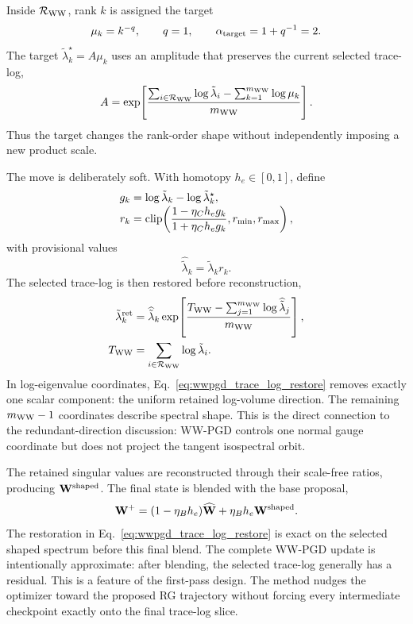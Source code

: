 Inside $\mathcal R_{\rm WW}$, rank $k$ is assigned the target
\begin{equation}
  \mu_k=k^{-q},
  \qquad q=1,
  \qquad \alpha_{\rm target}=1+q^{-1}=2.
  \label{eq:wwpgd_rank_target}
\end{equation}
The target $\tilde\lambda_k^{\star}=A\mu_k$ uses an amplitude that preserves the current selected trace-log,
\begin{equation}
  A
  =
  \exp\!\left[
  \frac{
  \sum_{i\in\mathcal R_{\rm WW}}\log\tilde\lambda_i
  -
  \sum_{k=1}^{m_{\rm WW}}\log\mu_k
  }{m_{\rm WW}}
  \right].
  \label{eq:wwpgd_target_amplitude}
\end{equation}
Thus the target changes the rank-order shape without independently imposing a new product scale.

The move is deliberately soft.  With homotopy $h_e\in[0,1]$, define
\begin{align}
  g_k
  &=
  \log\tilde\lambda_k-
  \log\tilde\lambda_k^{\star},
  \notag\\[-0.3em]
  r_k
  &=
  \operatorname{clip}\!\left(
  \frac{1-\eta_C h_e g_k}
       {1+\eta_C h_e g_k},
  r_{\min},r_{\max}
  \right),
  \label{eq:wwpgd_cayley_move}
\end{align}
with provisional values
\begin{equation}
  \widehat{\tilde\lambda}_k
  =
  \tilde\lambda_k r_k.
  \label{eq:wwpgd_provisional_eigenvalues}
\end{equation}
The selected trace-log is then restored before reconstruction,
\begin{align}
  \tilde\lambda_k^{\rm ret}
  &=
  \widehat{\tilde\lambda}_k
  \exp\!\left[
  \frac{
  T_{\rm WW}
  -
  \sum_{j=1}^{m_{\rm WW}}
  \log\widehat{\tilde\lambda}_j
  }{m_{\rm WW}}
  \right],
  \label{eq:wwpgd_trace_log_restore}\\
  T_{\rm WW}
  &=
  \sum_{i\in\mathcal R_{\rm WW}}
  \log\tilde\lambda_i.
  \label{eq:wwpgd_current_trace_log}
\end{align}
In log-eigenvalue coordinates, Eq.~\eqref{eq:wwpgd_trace_log_restore} removes exactly one scalar component: the uniform retained log-volume direction.  The remaining $m_{\rm WW}-1$ coordinates describe spectral shape.  This is the direct connection to the redundant-direction discussion: WW-PGD controls one normal gauge coordinate but does not project the tangent isospectral orbit.

The retained singular values are reconstructed through their scale-free ratios, producing $\mathbf W^{\rm shaped}$.  The final state is blended with the base proposal,
\begin{equation}
  \mathbf W^{+}
  =
  (1-\eta_B h_e)\widehat{\mathbf W}
  +
  \eta_B h_e\mathbf W^{\rm shaped}.
  \label{eq:wwpgd_final_blend}
\end{equation}
The restoration in Eq.~\eqref{eq:wwpgd_trace_log_restore} is exact on the selected shaped spectrum before this final blend.  The complete WW-PGD update is intentionally approximate: after blending, the selected trace-log generally has a residual.  This is a feature of the first-pass design.  The method nudges the optimizer toward the proposed RG trajectory without forcing every intermediate checkpoint exactly onto the final trace-log slice.

